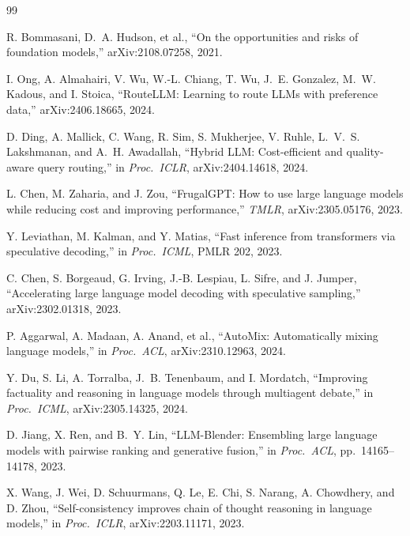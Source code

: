 \documentclass[conference]{IEEEtran}
\begin{document}
\balance

\begin{thebibliography}{99}

R. Bommasani, D.~A. Hudson, et al., ``On the opportunities and risks of foundation models,'' arXiv:2108.07258, 2021.

I. Ong, A. Almahairi, V. Wu, W.-L. Chiang, T. Wu, J.~E. Gonzalez, M.~W. Kadous, and I. Stoica, ``RouteLLM: Learning to route LLMs with preference data,'' arXiv:2406.18665, 2024.

D. Ding, A. Mallick, C. Wang, R. Sim, S. Mukherjee, V. Ruhle, L.~V.~S. Lakshmanan, and A.~H. Awadallah, ``Hybrid LLM: Cost-efficient and quality-aware query routing,'' in \textit{Proc.\ ICLR}, arXiv:2404.14618, 2024.

L. Chen, M. Zaharia, and J. Zou, ``FrugalGPT: How to use large language models while reducing cost and improving performance,'' \textit{TMLR}, arXiv:2305.05176, 2023.

Y. Leviathan, M. Kalman, and Y. Matias, ``Fast inference from transformers via speculative decoding,'' in \textit{Proc.\ ICML}, PMLR 202, 2023.

C. Chen, S. Borgeaud, G. Irving, J.-B. Lespiau, L. Sifre, and J. Jumper, ``Accelerating large language model decoding with speculative sampling,'' arXiv:2302.01318, 2023.

P. Aggarwal, A. Madaan, A. Anand, et al., ``AutoMix: Automatically mixing language models,'' in \textit{Proc.\ ACL}, arXiv:2310.12963, 2024.

Y. Du, S. Li, A. Torralba, J.~B. Tenenbaum, and I. Mordatch, ``Improving factuality and reasoning in language models through multiagent debate,'' in \textit{Proc.\ ICML}, arXiv:2305.14325, 2024.

D. Jiang, X. Ren, and B.~Y. Lin, ``LLM-Blender: Ensembling large language models with pairwise ranking and generative fusion,'' in \textit{Proc.\ ACL}, pp.\ 14165--14178, 2023.

X. Wang, J. Wei, D. Schuurmans, Q. Le, E. Chi, S. Narang, A. Chowdhery, and D. Zhou, ``Self-consistency improves chain of thought reasoning in language models,'' in \textit{Proc.\ ICLR}, arXiv:2203.11171, 2023.


\end{thebibliography}
\end{document}
